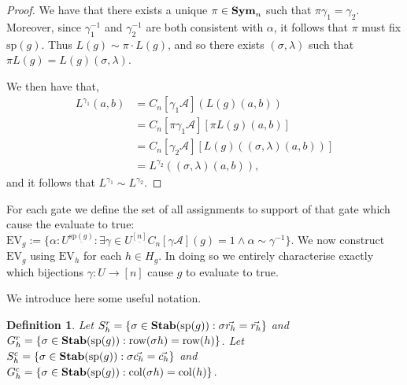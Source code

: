 \documentclass[12pt]{report}
\newtheorem{remark}[thm]{Remark} \newtheorem{definition}[thm]{Definition}
\newcommand{\stab}{\text{\textbf{Stab}}}
\newcommand{\sym}{\text{\textbf{Sym}}}
\newcommand{\consp}{\text{sp}}
\newcommand{\row}{\text{row}}
\newcommand{\column}{\text{col}}
\newcommand{\EV}{\text{EV}}
\newcommand{\spstab}[1]{\stab (\consp (#1))}
\begin{document}
\begin{proof}
  We have that there exists a unique $\pi \in \sym_n$ such that $\pi \gamma_1 =
  \gamma_2$. Moreover, since $\gamma^{-1}_1$ and $\gamma^{-1}_2$ are both
  consistent with $\alpha$, it follows that $\pi$ must fix $\consp(g)$. Thus
  $L(g) \sim \pi \cdot L(g)$, and so there exists $(\sigma, \lambda)$ such that
  $\pi L(g) = L(g) (\sigma, \lambda)$.

  We then have that,
  \begin{align*}
    L^{\gamma_1} (a,b) &= C_n[\gamma_1 \mathcal{A}](L(g)(a,b))\\
                       & = C_n[\pi \gamma_1 \mathcal{A}][\pi L(g)(a,b)] \\
                       & = C_n[\gamma_2 \mathcal{A}][L(g)((\sigma, \lambda)(a,b))]\\
                       & = L^{\gamma_2} ((\sigma, \lambda) (a,b)),
  \end{align*}
  and it follows that $L^{\gamma_1} \sim L^{\gamma_2}$.
\end{proof}

For each gate we define the set of all assignments to support of that gate which
cause the evaluate to true: $\EV_g := \{ \alpha: U^{\underline{\consp(g)}} :
\exists \gamma \in U^{\underline{[n]}} C_n [\gamma \mathcal{A}](g) = 1 \wedge
\alpha \sim \gamma^{-1}\}$. We now construct $\EV_g$ using $\EV_h$ for each $h
\in H_g$. In doing so we entirely characterise exactly which bijections $\gamma:
U \rightarrow [n]$ cause $g$ to evaluate to true.


We introduce here some useful notation.

\begin{definition}
  Let $S^r_h = \{ \sigma \in \stab (\consp(g)) : \sigma \vec{r_h} = \vec{r_h}
  \}$ and $G^r_h = \{ \sigma \in \stab(\consp(g)) : \row(\sigma h) = \row(h)\}$.
  Let $S^c_h = \{ \sigma \in \stab (\consp(g)) : \sigma \vec{c_h} = \vec{c_h}
  \}$ and $G^c_h = \{ \sigma \in \stab(\consp(g)) : \column(\sigma h) =
  \column(h)\}$.
\end{definition}
\end{document}

